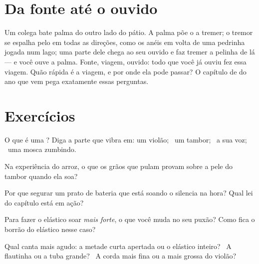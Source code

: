 \section{Da fonte até o ouvido}

\begin{example}\label{ex:g3:sound-around-us:journey}
Um colega bate palma do outro lado do pátio. A palma põe o  a
tremer; o tremor se espalha pelo  em todas as direções, como os
anéis em volta de uma pedrinha jogada num lago; uma parte dele chega
ao seu ouvido e faz tremer a pelinha de lá --- e você ouve a palma.
Fonte, viagem, ouvido: todo  que você já ouviu fez essa viagem.
Quão rápida é a viagem, e por onde ela pode passar? O capítulo de 
do ano que vem pega exatamente essas perguntas.
\end{example}

\section{Exercícios}

\begin{exercise}[$\star$]\label{exo:g3:sound-around-us:1}
O que é uma ? Diga a parte que vibra em: um violão; \ um
tambor; \ a sua voz; \ uma mosca zumbindo.
\end{exercise}

\begin{exercise}[$\star$]\label{exo:g3:sound-around-us:2}
Na experiência do arroz, o que os grãos que pulam provam sobre a pele
do tambor quando ela soa?
\end{exercise}

\begin{exercise}[$\star$]\label{exo:g3:sound-around-us:3}
Por que segurar um prato de bateria que está soando o silencia na
hora? Qual lei do capítulo está em ação?
\end{exercise}

\begin{exercise}[$\star$]\label{exo:g3:sound-around-us:4}
Para fazer o elástico soar \emph{mais forte}, o que você muda no seu
puxão? Como fica o borrão do elástico nesse caso?
\end{exercise}

\begin{exercise}[$\star$]\label{exo:g3:sound-around-us:5}
Qual canta mais agudo: a metade curta apertada ou o elástico
inteiro? \ A flautinha ou a tuba grande? \ A corda mais fina ou a
mais grossa do violão?
\end{exercise}

